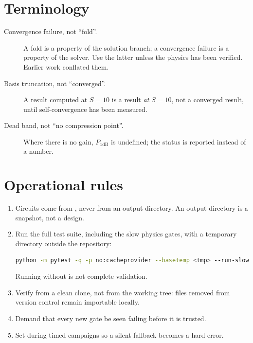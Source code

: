 \section{Terminology}

\begin{description}
\item[Convergence failure, not ``fold''.] A fold is a property of the solution
  branch; a convergence failure is a property of the solver. Use the latter
  unless the physics has been verified. Earlier work conflated them.

\item[Basis truncation, not ``converged''.] A result computed at $S=10$ is a
  result \emph{at $S=10$}, not a converged result, until self-convergence has
  been measured.

\item[Dead band, not ``no compression point''.] Where there is no gain,
  $P_{1\mathrm{dB}}$ is undefined; the status
   is reported instead of a number.
\end{description}

\section{Operational rules}

\begin{enumerate}
\item Circuits come from , never from an output directory. An
  output directory is a snapshot, not a design.
\item Run the full test suite, including the slow physics gates, with a
  temporary directory outside the repository:
\begin{lstlisting}[language=bash]
python -m pytest -q -p no:cacheprovider --basetemp <tmp> --run-slow
\end{lstlisting}
  Running without  is not complete validation.
\item Verify from a clean clone, not from the working tree: files removed from
  version control remain importable locally.
\item Demand that every new gate be seen failing before it is trusted.
\item Set  during timed campaigns so a silent
  fallback becomes a hard error.
\end{enumerate}

